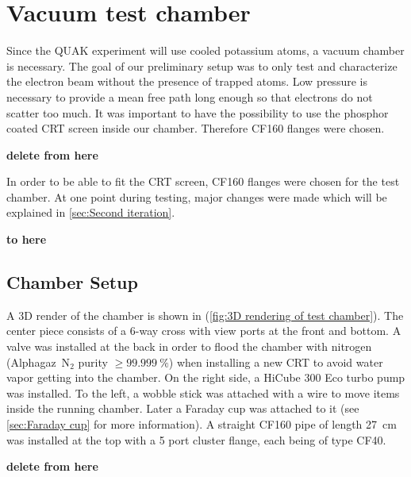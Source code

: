 
\chapter{Vacuum test chamber}
\label{ch:Vacuum chamber}

Since the QUAK experiment will use cooled potassium atoms, a vacuum chamber is necessary. The goal of our preliminary setup was to only test and characterize the electron beam without the presence of trapped atoms. Low pressure is necessary to provide a mean free path long enough so that electrons do not scatter too much. It was important to have the possibility to use the phosphor coated CRT screen inside our chamber. Therefore CF160 flanges were chosen.

\textbf{delete from here}

In order to be able to fit the CRT screen, CF160 flanges were chosen for the test chamber. At one point during testing, major changes were made which will be explained in \cref{sec:Second iteration}.


\textbf{to here}

\section{Chamber Setup}
\label{sec:Chamber Setup}

A 3D render of the chamber is shown in (\cref{fig:3D rendering of test chamber}). The center piece consists of a 6-way cross with view ports at the front and bottom. A valve was installed at the back in order to flood the chamber with nitrogen (Alphagaz\texttrademark~N$_2$ purity $\ge\SI{99.999}{\percent}$) when installing a new CRT to avoid water vapor getting into the chamber. On the right side, a HiCube 300 Eco turbo pump was installed. To the left, a wobble stick was attached with a wire to move items inside the running chamber. Later a Faraday cup was attached to it (see \cref{sec:Faraday cup} for more information). A straight CF160 pipe of length \SI{27}{\centi\meter} was installed at the top with a 5 port cluster flange, each being of type CF40.

\textbf{delete from here}

